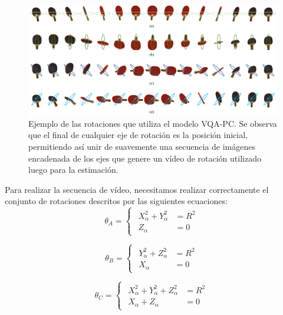 \begin{figure}
  \begin{center}
    \includegraphics[width=\textwidth]{imagenes/chapter4/VQARotation}
  \end{center}
  \caption[Ejemplo de las rotaciones que utiliza el modelo VQA-PC\cite{VQA-PC}.]
  {Ejemplo de las rotaciones que utiliza el modelo VQA-PC\cite{VQA-PC}.
  Se observa que el final de cualquier eje de rotación es la posición inicial, 
permitiendo así unir de suavemente una secuencia de imágenes encadenada de los ejes 
que genere un vídeo de rotación utilizado luego para la estimación.}
  \label{fig:VQARotation}
\end{figure}

Para realizar la secuencia de vídeo, necesitamos realizar correctamente 
el conjunto de rotaciones descritos por las siguientes ecuaciones: 
\begin{equation}
  \theta_A = 
\begin{cases}
\begin{aligned}
   X_\alpha^2 + Y_\alpha^2 & = R^2 \\ 
    Z_\alpha & = 0 
\end{aligned}
\end{cases}
\label{eq:RotationA}
\end{equation}

\begin{equation}
  \theta_B = 
\begin{cases}
\begin{aligned}
   Y_\alpha^2 + Z_\alpha^2 & = R^2 \\ 
    X_\alpha & = 0 
\end{aligned}
\end{cases}
\label{eq:RotationB}
\end{equation}

\begin{equation}
  \theta_C = 
\begin{cases}
\begin{aligned}
   X_\alpha^2 + Y_\alpha^2 + Z_\alpha^2 & = R^2 \\ 
    X_\alpha + Z_\alpha & = 0 
\end{aligned}
\end{cases}
\label{eq:RotationC}
\end{equation}

